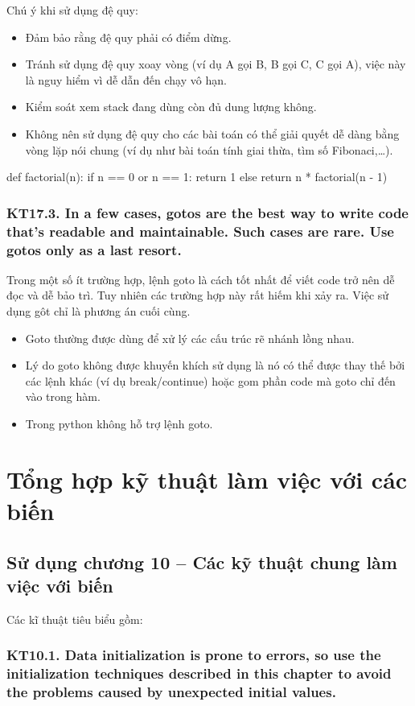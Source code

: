\documentclass[12pt]{report}
\begin{document}
\noindent Chú ý khi sử dụng đệ quy:
\begin{itemize}
	\item Đảm bảo rằng đệ quy phải có điểm dừng.
	\item Tránh sử dụng đệ quy xoay vòng (ví dụ A gọi B, B gọi C, C gọi A), việc này là nguy hiểm vì dễ dẫn đến chạy vô hạn.
	\item Kiểm soát xem stack đang dùng còn đủ dung lượng không.
	\item Không nên sử dụng đệ quy cho các bài toán có thể giải quyết dễ dàng bằng vòng lặp nói chung (ví dụ như bài toán tính giai thừa, tìm số Fibonaci,…).
\end{itemize}
\begin{python}
def factorial(n):
	if n == 0 or n == 1:
		return 1
	else 
		return n * factorial(n - 1)
\end{python}


\subsubsection{KT17.3. In a few cases, gotos are the best way to write code that's readable and maintainable. Such cases are rare. Use gotos only as a last resort.}
Trong một số ít trường hợp, lệnh goto là cách tốt nhất để viết code trở nên dễ đọc và dễ bảo trì. Tuy nhiên các trường hợp này rất hiếm khi xảy ra. Việc sử dụng gôt chỉ là phương án cuối cùng.
\begin{itemize}
	\item Goto thường được dùng để xử lý các cấu trúc rẽ nhánh lồng nhau.
	\item Lý do goto không được khuyến khích sử dụng là nó có thể được thay thế bởi các lệnh khác (ví dụ break/continue) hoặc gom phần code mà goto chỉ đến vào trong hàm.
	\item Trong python không hỗ trợ lệnh goto.
\end{itemize}


\section{\bfseries Tổng hợp kỹ thuật làm việc với các biến}

\subsection{Sử dụng chương 10 -- Các kỹ thuật chung làm việc với biến}
\noindent Các kĩ thuật tiêu biểu gồm:
\subsubsection{KT10.1. Data initialization is prone to errors, so use the initialization techniques described in this chapter to avoid the problems caused by unexpected initial values.}
\end{document}
